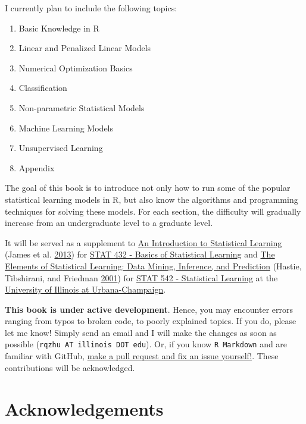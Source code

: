\documentclass[
]{book}
\providecommand{\tightlist}{%
  \setlength{\itemsep}{0pt}\setlength{\parskip}{0pt}}
\begin{document}
I currently plan to include the following topics:

\begin{enumerate}
\def\labelenumi{\arabic{enumi}.}
\tightlist
\item
  Basic Knowledge in R
\item
  Linear and Penalized Linear Models
\item
  Numerical Optimization Basics
\item
  Classification
\item
  Non-parametric Statistical Models
\item
  Machine Learning Models
\item
  Unsupervised Learning
\item
  Appendix
\end{enumerate}

The goal of this book is to introduce not only how to run some of the popular statistical learning models in R, but also know the algorithms and programming techniques for solving these models. For each section, the difficulty will gradually increase from an undergraduate level to a graduate level.

It will be served as a supplement to \href{http://www-bcf.usc.edu/~gareth/ISL/}{An Introduction to Statistical Learning} (James et al. \protect\hyperlink{ref-james2013introduction}{2013}) for \href{https://go.illinois.edu/stat432}{STAT 432 - Basics of Statistical Learning} and \href{https://web.stanford.edu/~hastie/ElemStatLearn/}{The Elements of
Statistical Learning: Data Mining, Inference, and Prediction} (Hastie, Tibshirani, and Friedman \protect\hyperlink{ref-hastie2001elements}{2001}) for \href{https://go.illinois.edu/stat542}{STAT 542 - Statistical Learning} at the \href{http://illinois.edu/}{University of Illinois at Urbana-Champaign}.

\textbf{This book is under active development}. Hence, you may encounter errors ranging from typos to broken code, to poorly explained topics. If you do, please let me know! Simply send an email and I will make the changes as soon as possible (\texttt{rqzhu\ AT\ illinois\ DOT\ edu}). Or, if you know \texttt{R\ Markdown} and are familiar with GitHub, \href{https://github.com/teazrq/SLWR}{make a pull request and fix an issue yourself!}. These contributions will be acknowledged.

\hypertarget{acknowledgements}{%
\section*{Acknowledgements}\label{acknowledgements}}
\end{document}
